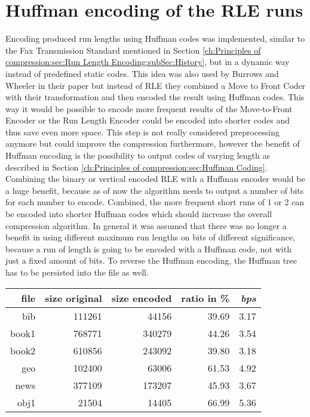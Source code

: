 {{\section{Huffman encoding of the RLE runs}
\label{ch:Conceptual Design:sec:Postprocessing}
\par{
Encoding produced run lengths using Huffman codes was implemented, similar to the Fax Transmission Standard mentioned in Section \ref{ch:Principles of compression:sec:Run Length Encoding:subSec:History}, but in a dynamic way instead of predefined static codes. This idea was also used by Burrows and Wheeler in their paper \cite{Burrows94} but instead of RLE they combined a Move to Front Coder with their transformation and then encoded the result using Huffman codes. This way it would be possible to encode more frequent results of the Move-to-Front Encoder or the Run Length Encoder could be encoded into shorter codes and thus save even more space. This step is not really considered preprocessing anymore but could improve the compression furthermore, however the benefit of Huffman encoding is the possibility to output codes of varying length as described in Section \ref{ch:Principles of compression:sec:Huffman Coding}. Combining the binary or vertical encoded RLE with a Huffman encoder would be a huge benefit, because as of now the algorithm needs to output a number of bits for each number to encode. Combined, the more frequent short runs of 1 or 2 can be encoded into shorter Huffman codes which should increase the overall compression algorithm. In general it was assumed that there was no longer a benefit in using different maximum run lengths on bits of different significance, because a run of length is going to be encoded with a Huffman code, not with just a fixed amount of bits. To reverse the Huffman encoding, the Huffman tree has to be persisted into the file as well.
	\begin{table}[H]
		\centering
		\begin{tabular}{r|r|r|r|r}	
			file & size original & size encoded & ratio in \% & \textit{bps}\\
			\hline
bib & 111261 & 44156 & 39.69 & 3.17 \\
book1 & 768771 & 340279 & 44.26 & 3.54 \\
book2 & 610856 & 243092 & 39.80 & 3.18 \\
geo & 102400 & 63006 & 61.53 & 4.92 \\
news & 377109 & 173207 & 45.93 & 3.67 \\
obj1 & 21504 & 14405 & 66.99 & 5.36 \\

\end{tabular}
\end{table}}}}
